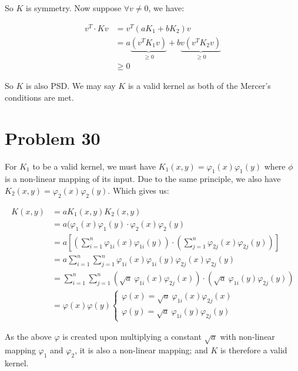 \documentclass[12pt]{article}
\newcommand{\vphi}{\varphi}
\begin{document}
So $K$ is symmetry. Now suppose $\forall v \neq 0$, we have:

\begin{align*}
    v^T \cdot K v &= v^T (aK_1 + bK_2)v \\
    &= a\underbrace{(v^T K_1 v)}_{\geq 0} + b\underbrace{v(v^T K_2 v)}_{\geq 0}  \\
    &\geq 0
\end{align*}

So $K$ is also PSD. We may say $K$ is a valid kernel as both of the Mercer's conditions are met.

\section{Problem 30}

For $K_1$ to be a valid kernel, we must have $K_1(x, y) = \vphi_1(x) \vphi_1(y)$ where $\phi$ is a non-linear mapping of its input. Due to the same principle, we also have $K_2(x, y) = \vphi_2(x) \vphi_2(y)$. Which gives us:

\begin{align*}
    K(x, y) &= a K_1(x, y) K_2(x, y) \\
    &= a( \vphi_1(x) \vphi_1(y) \cdot  \vphi_2(x) \vphi_2(y) \\
    &= a[(\sum_{i=1}^{n} \vphi_{1i}(x) \vphi_{1i}(y) ) \cdot (\sum_{j=1}^{n} \vphi_{2j}(x) \vphi_{2j}(y))] \\
    &= a \sum_{i=1}^{n} \sum_{j=1}^{n} \vphi_{1i}(x) \vphi_{1i}(y) \vphi_{2j}(x) \vphi_{2j}(y) \\
    &= \sum_{i=1}^{n} \sum_{j=1}^{n} (\sqrt{a} \  \vphi_{1i}(x) \vphi_{2j}(x) ) \cdot (\sqrt{a} \  \vphi_{1i}(y)\vphi_{2j}(y)) \\
    &= \vphi(x)\vphi(y)
        \begin{cases}
        \vphi(x) = \sqrt{a} \  \vphi_{1i}(x) \vphi_{2j}(x) \\
        \vphi(y) = \sqrt{a} \  \vphi_{1i}(y)\vphi_{2j}(y)
        \end{cases}
\end{align*}

As the above $\vphi$ is created upon multiplying a constant $\sqrt{a}$ with non-linear mapping $\vphi_1$ and $\vphi_2$, it is also a non-linear mapping; and $K$ is therefore a valid kernel.
\end{document}
